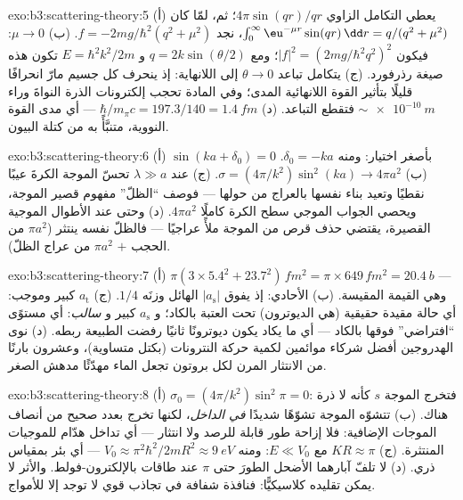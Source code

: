 \begin{solution}{exo:b3:scattering-theory:5}
(أ) يعطي التكامل الزاوي $4\pi\sin(qr)/qr$؛ ثم، لمّا كان
$\int_0^\infty\eu^{-\mu r}\sin(qr)\,\dd r = q/(q^2 + \mu^2)$،
نجد $f = -2mg/\hbar^2(q^2 + \mu^2)$. (ب) $\mu \to 0$: فيكون $|f|^2 =
(2mg/\hbar^2q^2)^2$؛ ومع $q = 2k\sin(\theta/2)$ و $E =
\hbar^2k^2/2m$ تكون هذه صيغة رذرفورد. (ج) يتكامل تباعد $\theta \to
0$ إلى اللانهاية: إذ ينحرف كل جسيم مارّ انحرافًا
قليلًا بتأثير القوة اللانهائية المدى؛ وفي المادة تحجب إلكترونات
الذرة النواةَ وراء $\sim\qty{e-10}{m}$ فتقطع
التباعد. (د) $\hbar/m_\pi c = 197.3/140 = \qty{1.4}{fm}$
--- أي مدى القوة النووية، متنبَّأً به من كتلة البيون.
\end{solution}

\begin{solution}{exo:b3:scattering-theory:6}
(أ) $\sin(ka + \delta_0) = 0$ بأصغر اختيار: ومنه $\delta_0
= -ka$. (ب) $\sigma = (4\pi/k^2)\sin^2(ka) \to 4\pi a^2$. (ج) عند
$\lambda \gg a$ تحسّ الموجة الكرةَ عيبًا نقطيًا
وتعيد بناء نفسها بالعراج من حولها --- فوصف ``الظلّ'' مفهوم
قصير الموجة، ويحصي الجواب الموجي سطح الكرة كاملًا
$4\pi a^2$. (د) وحتى عند الأطوال الموجية القصيرة، يقتضي
حذف قرص من الموجة ملأً عراجيًا --- فالظلّ نفسه ينتثر
($\pi a^2$ من الحجب $+$ $\pi a^2$ من عراج الظلّ).
\end{solution}

\begin{solution}{exo:b3:scattering-theory:7}
(أ) $\pi(3 \times 5.4^2 + 23.7^2)\,\unit{fm^2} = \pi \times 649
\,\unit{fm^2} = \qty{20.4}{b}$ --- وهي القيمة المقيسة. (ب)
الأحادي: إذ يفوق $|a_{\text{s}}|$ الهائل وزنَه $1/4$. (ج)
$a_{\text{t}}$ كبير وموجب: أي حالة مقيدة حقيقية (هي
الديوترون) تحت العتبة بالكاد؛ و $a_{\text{s}}$ كبير و
\emph{سالب}: أي مستوًى ``افتراضي'' فوقها بالكاد --- أي ما يكاد يكون
ديوترونًا ثانيًا رفضت الطبيعة ربطه. (د) نوى
الهدروجين أفضل شركاء موائمين لكمية حركة النترونات
(بكتل متساوية)، وعشرون بارنًا من الانتثار المرن لكل بروتون
تجعل الماء مهدّئًا مدهش الصغر.
\end{solution}

\begin{solution}{exo:b3:scattering-theory:8}
(أ) $\sigma_0 = (4\pi/k^2)\sin^2\pi = 0$: فتخرج الموجة $s$
كأنه لا ذرة هناك. (ب) تتشوّه الموجة تشوّهًا شديدًا
\emph{في الداخل}، لكنها تخرج بعدد صحيح من أنصاف
الموجات الإضافية: فلا إزاحة طور قابلة للرصد ولا انتثار ---
أي تداخل هدّام للموجيات المنتثرة. (ج) $KR
\approx \pi$ مع $E \ll V_0$: ومنه $V_0 \approx \pi^2\hbar^2/2mR^2
\approx \qty{9}{eV}$ --- أي بئر بمقياس ذري. (د) لا تلفّ
آبارهما الأضحل الطورَ حتى $\pi$ عند طاقات بالإلكترون-فولط.
والأثر لا يمكن تقليده كلاسيكيًّا: فنافذة شفافة في تجاذب
قوي لا توجد إلا للأمواج.
\end{solution}


